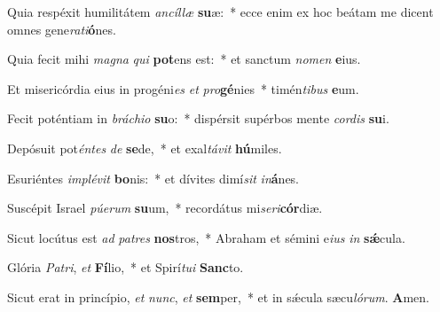 \item Quia respéxit humilitátem \textit{ancíllæ} \textbf{su}æ:~* ecce enim ex hoc beátam me dicent omnes gene\textit{rati}\textbf{ó}nes.

\item Quia fecit mihi \textit{magna} \textit{qui} \textbf{pot}ens est:~* et sanctum \textit{nomen} \textbf{e}ius.

\item Et misericórdia eius in progéni\textit{es} \textit{et} \textit{pro}\textbf{gé}nies~* timén\textit{tibus} \textbf{e}um.

\item Fecit poténtiam in \textit{bráchio} \textbf{su}o:~* dispérsit supérbos mente \textit{cordis} \textbf{su}i.

\item Depósuit pot\textit{éntes} \textit{de} \textbf{se}de,~* et exal\textit{távit} \textbf{hú}miles.

\item Esuriéntes \textit{implévit} \textbf{bo}nis:~* et dívites dimí\textit{sit} \textit{in}\textbf{á}nes.

\item Suscépit Israel \textit{púerum} \textbf{su}um,~* recordátus mi\textit{seri}\textbf{cór}diæ.

\item Sicut locútus est \textit{ad} \textit{patres} \textbf{nos}tros,~* Abraham et sémini e\textit{ius} \textit{in} \textbf{sǽ}cula.

\item Glória \textit{Patri}, \textit{et} \textbf{Fí}lio,~* et Spirí\textit{tui} \textbf{Sanc}to.

\item Sicut erat in princípio, \textit{et} \textit{nunc}, \textit{et} \textbf{sem}per,~* et in sǽcula sæcu\textit{lórum}. \textbf{A}men.